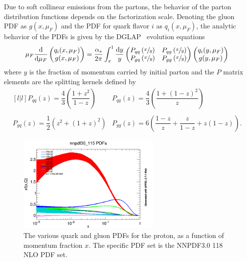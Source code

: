 Due to soft collinear emissions from the partons, the behavior of the parton distribution functions depends on the factorization scale.
Denoting the gluon PDF as $g(x, \mu_F)$ and the PDF for quark flavor $i$ as $q_i(x, \mu_F)$, the analytic behavior of the PDFs is given by the DGLAP~\cite{Dokshitzer1977, Gribov1972, Altarelli1977} evolution equations
\begin{equation}
  \mu_F \frac{\text{d}}{\text{d} \mu_F} \begin{pmatrix} q_i(x, \mu_F) \\ g(x, \mu_F) \end{pmatrix}
  = \frac{\alpha_s}{2\pi} \int_{x}^{1} \frac{\text{d}y}{y}
  \begin{pmatrix}
     P_{qq}\left(\sfrac{x}{y}\right) &  P_{qg}\left(\sfrac{x}{y}\right) \\
     P_{gq}\left(\sfrac{x}{y}\right) &  P_{gg}\left(\sfrac{x}{y}\right) 
  \end{pmatrix}
    \begin{pmatrix} q_i(y, \mu_F) \\ g(y, \mu_F) \end{pmatrix}
\end{equation}
where $y$ is the fraction of momentum carried by initial parton and the $P$ matrix elements are the splitting kernels defined by
\begin{equation}
  \begin{matrix}[l | l]
    P_{qq}(z) = \dfrac{4}{3} \left( \dfrac{1+z^2}{1-z} \right)
    & P_{qg}(z) = \dfrac{4}{3} \left( \dfrac{1+(1-z)^2}{z} \right)
    \\ \\ P_{gq}(z) = \dfrac{1}{2} \left( z^2 + (1+z)^2 \right)
    & P_{gg}(z) = 6 \left( \dfrac{1-z}{z} + \dfrac{z}{1-z} + z(1-z) \right) .
  \end{matrix}
\end{equation}

\begin{figure}[htbp]
  \centering
  \includegraphics[width=0.625\textwidth]{Collider/Figures/nnpdf30_115_test.png}
  \caption{
    The various quark and gluon PDFs for the proton, as a function of momentum fraction $x$.
    The specific PDF set is the NNPDF3.0 118 NLO PDF set.
  }
  \label{fig:nnpdf}
\end{figure}

